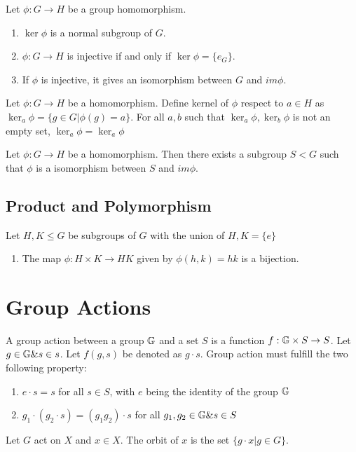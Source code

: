 \documentclass[../note.tex]{subfiles}
\begin{document}
\begin{theorem}
	Let $\phi : G \rightarrow H$ be a group homomorphism.
\begin{enumerate}
	\item $\ker{\phi}$ is a normal subgroup of $G$. 
	\item $\phi: G \rightarrow H$ is injective if and only if $\ker{\phi} = \{e_{G}\}$.
	\item If $\phi$ is injective, it gives an isomorphism between $G$ and $im{\phi}$.
\end{enumerate}
\end{theorem}

\begin{hypothesis}
	Let $\phi: G \rightarrow H$ be a homomorphism.
	Define kernel of $\phi$ respect to $a \in H$ as $\ker_a{\phi}=\{g\in G| \phi(g)=a\}$.
	For all $a, b$ such that $\ker_a{\phi}, \ker_b{\phi}$ is not an empty set, $\ker_a{\phi}=\ker_a{\phi}$ 
\end{hypothesis}

\begin{hypothesis}
	Let $\phi: G \rightarrow H$ be a homomorphism. Then there exists a subgroup $S < G$ such that $\phi$ is a isomorphism between $S$ and $im \phi$.
\end{hypothesis}

\subsection{Product and Polymorphism}

\begin{theorem}
	Let $H, K \leq G$ be subgroups of $G$ with the union of $H, K = \{e\}$
	\begin{enumerate}
		\item The map $\phi: H\times K \rightarrow HK$ given by $\phi(h,k) = hk$ is a bijection.
	\end{enumerate}
\end{theorem}
\section{Group Actions}
\begin{definition}
	A group action between a group $\mathbb{G}$ and a set $S$ is a function $f: \mathbb{G}\times S \rightarrow S$. 
	Let $g\in \mathbb{G} \& s \in s$. Let $f(g,s)$ be denoted as $g\cdot s$. Group action must fulfill the two following property:
	\begin{enumerate}
		\item $e\cdot s=s$ for all $s\in S$, with $e$ being the identity of the group $\mathbb{G}$
		\item $g_1\cdot(g_2 \cdot s) = (g_1 g_2) \cdot s$ for all $g_1, g_2 \in \mathbb{G} \& s \in S$
	\end{enumerate}
\end{definition}
\begin{definition}[Orbit]
	Let $G$ act on $X$ and $x \in X$. The orbit of $x$ is the set $\{g\cdot x | g \in G\}$.	
\end{definition}
\end{document}
